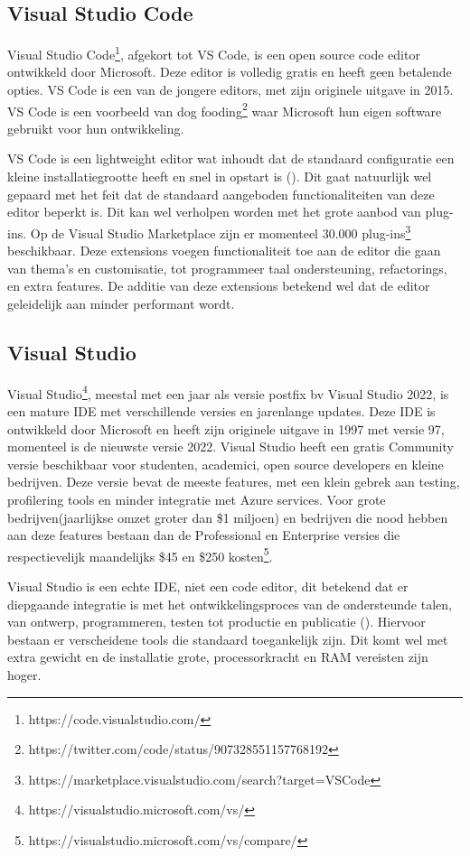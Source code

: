 \subsection{Visual Studio Code}
Visual Studio Code\footnote{https://code.visualstudio.com/}, afgekort tot VS Code, is een open source code editor ontwikkeld door Microsoft. Deze editor is volledig gratis en heeft geen betalende opties. VS Code is een van de jongere editors, met zijn originele uitgave in 2015. VS Code is een voorbeeld van dog fooding\footnote{https://twitter.com/code/status/907328551157768192} waar Microsoft hun eigen software gebruikt voor hun ontwikkeling.

VS Code is een lightweight editor wat inhoudt dat de standaard configuratie een kleine installatiegrootte heeft en snel in opstart is (\textcite{Johnson2019}). Dit gaat natuurlijk wel gepaard met het feit dat de standaard aangeboden functionaliteiten van deze editor beperkt is. Dit kan wel verholpen worden met het grote aanbod van plug-ins. Op de Visual Studio Marketplace zijn er momenteel 30.000 plug-ins\footnote{https://marketplace.visualstudio.com/search?target=VSCode} beschikbaar. Deze extensions voegen functionaliteit toe aan de editor die gaan van thema’s en customisatie, tot programmeer taal ondersteuning, refactorings, en extra features. De additie van deze extensions betekend wel dat de editor geleidelijk aan minder performant wordt.

\subsection{Visual Studio }
Visual Studio\footnote{https://visualstudio.microsoft.com/vs/}, meestal met een jaar als versie postfix bv Visual Studio 2022, is een mature IDE met verschillende versies en jarenlange updates. Deze IDE is ontwikkeld door Microsoft en heeft zijn originele uitgave in 1997 met versie 97, momenteel is de nieuwste versie 2022. Visual Studio heeft een gratis Community versie beschikbaar voor studenten, academici, open source developers en kleine bedrijven. Deze versie bevat de meeste features, met een klein gebrek aan testing, profilering tools en minder integratie met Azure services. Voor grote bedrijven(jaarlijkse omzet groter dan \$1 miljoen) en bedrijven die nood hebben aan deze features bestaan dan de Professional en Enterprise versies die respectievelijk maandelijks \$45 en \$250 kosten\footnote{https://visualstudio.microsoft.com/vs/compare/}.

Visual Studio is een echte IDE, niet een code editor, dit betekend dat er diepgaande integratie is met het ontwikkelingsproces van de ondersteunde talen, van ontwerp, programmeren, testen tot productie en publicatie (\textcite{Strauss2019}). Hiervoor bestaan er verscheidene tools die standaard toegankelijk zijn. Dit komt wel met extra gewicht en de installatie grote, processorkracht en RAM vereisten zijn hoger.

